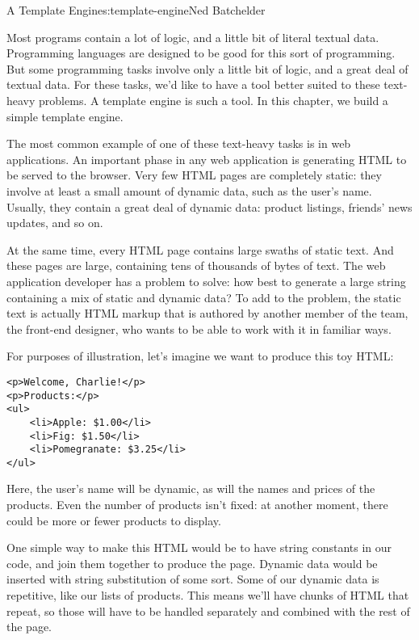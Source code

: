 \begin{aosachapter}{A Template Engine}{s:template-engine}{Ned Batchelder}

\label{introduction}

Most programs contain a lot of logic, and a little bit of literal
textual data. Programming languages are designed to be good for this
sort of programming. But some programming tasks involve only a little
bit of logic, and a great deal of textual data. For these tasks, we'd
like to have a tool better suited to these text-heavy problems. A
template engine is such a tool. In this chapter, we build a simple
template engine.

The most common example of one of these text-heavy tasks is in web
applications. An important phase in any web application is generating
HTML to be served to the browser. Very few HTML pages are completely
static: they involve at least a small amount of dynamic data, such as
the user's name. Usually, they contain a great deal of dynamic data:
product listings, friends' news updates, and so on.

At the same time, every HTML page contains large swaths of static text.
And these pages are large, containing tens of thousands of bytes of
text. The web application developer has a problem to solve: how best to
generate a large string containing a mix of static and dynamic data? To
add to the problem, the static text is actually HTML markup that is
authored by another member of the team, the front-end designer, who
wants to be able to work with it in familiar ways.

For purposes of illustration, let's imagine we want to produce this toy
HTML:

\begin{verbatim}
<p>Welcome, Charlie!</p>
<p>Products:</p>
<ul>
    <li>Apple: $1.00</li>
    <li>Fig: $1.50</li>
    <li>Pomegranate: $3.25</li>
</ul>
\end{verbatim}

Here, the user's name will be dynamic, as will the names and prices of
the products. Even the number of products isn't fixed: at another
moment, there could be more or fewer products to display.

One simple way to make this HTML would be to have string constants in
our code, and join them together to produce the page. Dynamic data would
be inserted with string substitution of some sort. Some of our dynamic
data is repetitive, like our lists of products. This means we'll have
chunks of HTML that repeat, so those will have to be handled separately
and combined with the rest of the page.


\end{aosachapter}
